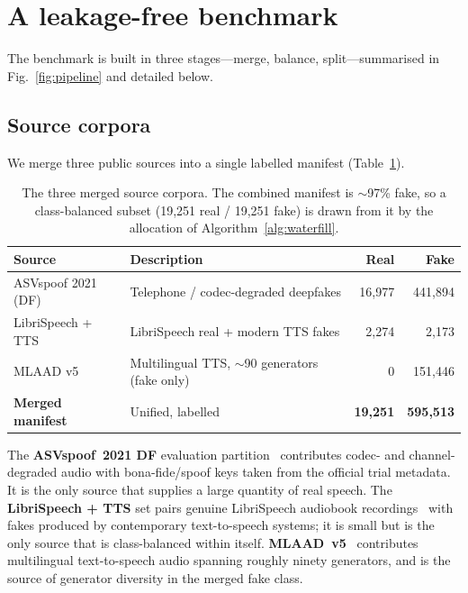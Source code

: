 \documentclass[sn-mathphys-num,pdflatex]{sn-jnl}
\begin{document}
\section{A leakage-free benchmark}\label{sec:benchmark}

The benchmark is built in three stages---merge, balance, split---summarised in
Fig.~\ref{fig:pipeline} and detailed below.

\subsection{Source corpora}\label{sec:sources}

We merge three public sources into a single labelled manifest
(Table~\ref{tab:datasets}).

\begin{table}[t]
\centering
\caption{The three merged source corpora. The combined manifest is $\sim$97\%
fake, so a class-balanced subset (19{,}251 real / 19{,}251 fake) is drawn from it
by the allocation of Algorithm~\ref{alg:waterfill}.}
\label{tab:datasets}
\small\setlength{\tabcolsep}{5pt}
\begin{tabular}{@{}llrr@{}}
\toprule
Source & Description & Real & Fake \\
\midrule
ASVspoof 2021 (DF)       & Telephone / codec-degraded deepfakes & 16{,}977 & 441{,}894 \\
LibriSpeech + TTS        & LibriSpeech real + modern TTS fakes  & 2{,}274  & 2{,}173 \\
MLAAD v5                 & Multilingual TTS, $\sim$90 generators (fake only) & 0 & 151{,}446 \\
\midrule
\textbf{Merged manifest} & Unified, labelled & \textbf{19{,}251} & \textbf{595{,}513} \\
\bottomrule
\end{tabular}
\end{table}

The \textbf{ASVspoof~2021 DF} evaluation partition~\cite{asvspoof21} contributes
codec- and channel-degraded audio with bona-fide/spoof keys taken from the
official trial metadata. It is the only source that supplies a large quantity of
real speech. The \textbf{LibriSpeech + TTS} set pairs genuine LibriSpeech
audiobook recordings~\cite{librispeech} with fakes produced by contemporary
text-to-speech systems; it is small but is the only source that is
class-balanced within itself. \textbf{MLAAD~v5}~\cite{mlaad} contributes
multilingual text-to-speech audio spanning roughly ninety generators, and is the
source of generator diversity in the merged fake class.
\end{document}
